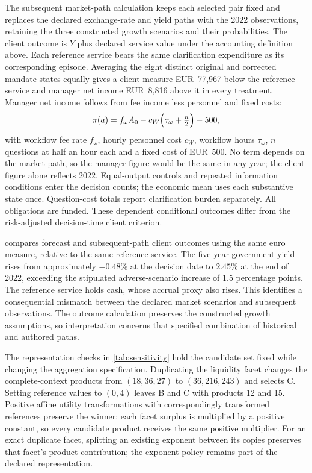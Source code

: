 \documentclass[oneside,10pt,english]{swissi}
\begin{document}
The subsequent market-path calculation keeps each selected pair fixed and replaces the declared exchange-rate and yield paths with the 2022 observations, retaining the three constructed growth scenarios and their probabilities. The client outcome is $Y$ plus declared service value under the accounting definition above. Each reference service bears the same clarification expenditure as its corresponding episode. Averaging the eight distinct original and corrected mandate states equally gives a client measure EUR~77,967 below the reference service and manager net income EUR~8,816 above it in every treatment. Manager net income follows from fee income less personnel and fixed costs:
\begin{equation}
 \pi(a)=f_\omega A_0-c_W\Bigl(\tau_\omega+\tfrac{n}{2}\Bigr)-500,
 \label{eq:manager-income}
\end{equation}
with workflow fee rate $f_\omega$, hourly personnel cost $c_W$, workflow hours $\tau_\omega$, $n$ questions at half an hour each and a fixed cost of EUR~500. No term depends on the market path, so the manager figure would be the same in any year; the client figure alone reflects 2022. Equal-output controls and repeated information conditions enter the decision counts; the economic mean uses each substantive state once. Question-cost totals report clarification burden separately. All obligations are funded. These dependent conditional outcomes differ from the risk-adjusted decision-time client criterion.

 compares forecast and subsequent-path client outcomes using the same euro measure, relative to the same reference service. The five-year government yield rises from approximately $-0.48\%$ at the decision date to $2.45\%$ at the end of 2022, exceeding the stipulated adverse-scenario increase of 1.5 percentage points. The reference service holds cash, whose accrual proxy also rises. This identifies a consequential mismatch between the declared market scenarios and subsequent observations. The outcome calculation preserves the constructed growth assumptions, so interpretation concerns that specified combination of historical and authored paths.



The representation checks in \cref{tab:sensitivity} hold the candidate set fixed while changing the aggregation specification. Duplicating the liquidity facet changes the complete-context products from $(18,36,27)$ to $(36,216,243)$ and selects C. Setting reference values to $(0,4)$ leaves B and C with products 12 and 15. Positive affine utility transformations with correspondingly transformed references preserve the winner: each facet surplus is multiplied by a positive constant, so every candidate product receives the same positive multiplier. For an exact duplicate facet, splitting an existing exponent between its copies preserves that facet's product contribution; the exponent policy remains part of the declared representation.
\end{document}

